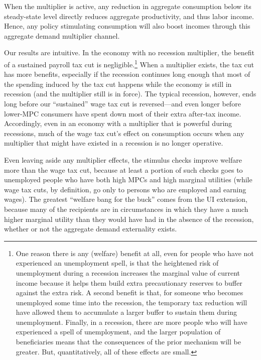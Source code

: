 \documentclass{econsocart}
\begin{document}

When the multiplier is active, any reduction in aggregate consumption below its steady-state level directly reduces aggregate productivity, and thus labor income. Hence, any policy stimulating consumption will also boost incomes through this aggregate demand multiplier channel.

Our results are intuitive.  In the economy with no recession multiplier, the benefit of a sustained payroll tax cut is negligible.\footnote{One reason there is any (welfare) benefit at all, even for people who have not experienced an unemployment spell, is that the heightened risk of unemployment during a recession increases the marginal value of current income because it helps them build extra precautionary reserves to buffer against the extra risk.  A second benefit is that, for someone who becomes unemployed some time into the recession, the temporary tax reduction will have allowed them to accumulate a larger buffer to sustain them during unemployment.  Finally, in a recession, there are more people who will have experienced a spell of unemployment, and the larger population of beneficiaries means that the consequences of the prior mechanism will be greater.  But, quantitatively, all of these effects are small.}
When a multiplier exists, the tax cut has more benefits, especially if the recession continues long enough that most of the spending induced by the tax cut happens while the economy is still in recession (and the multiplier still is in force).  The typical recession, however, ends long before our ``sustained'' wage tax cut is reversed---and even longer before lower-MPC consumers have spent down most of their extra after-tax income. Accordingly, even in an economy with a multiplier that is powerful during recessions, much of the wage tax cut's effect on consumption occurs when any multiplier that might have existed in a recession is no longer operative.

Even leaving aside any multiplier effects, the stimulus checks improve welfare more than the wage tax cut, because at least a portion of such checks goes to unemployed people who have both high MPCs and high marginal utilities (while wage tax cuts, by definition, go only to persons who are employed and earning wages). The greatest ``welfare bang for the buck'' comes from the UI extension, because many of the recipients are in circumstances in which they have a much higher marginal utility than they would have had in the absence of the recession, whether or not the aggregate demand externality exists.
\end{document}
